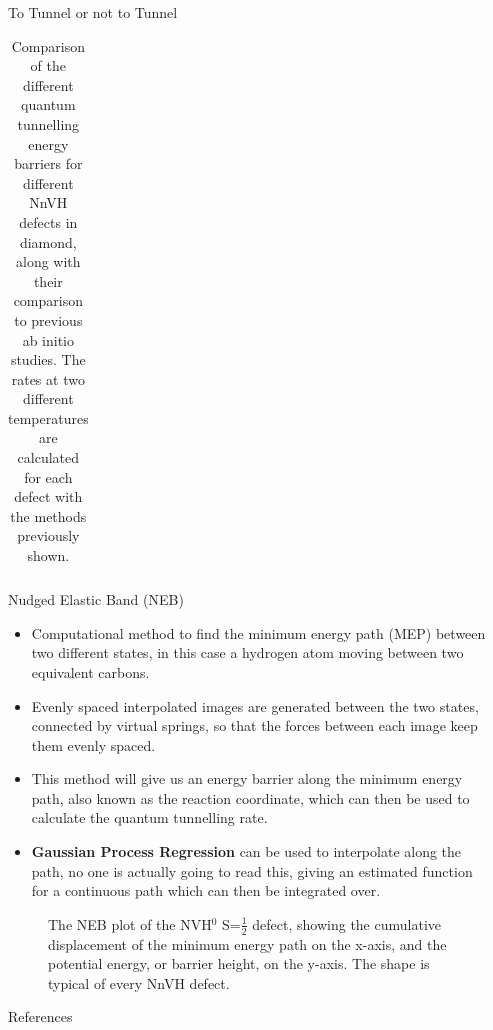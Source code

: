 \documentclass[final]{beamer}
\newlength{\sepwidth}
\newlength{\colwidth}
\newcommand{\separatorcolumn}{\begin{column}{\sepwidth}\end{column}}
\begin{document}
\begin{frame}[t]
\begin{columns}[t]
\begin{column}{\colwidth}
\begin{block}{To Tunnel or not to Tunnel}
\begin{table}[h!]
\begin{tabular}{l l c  c c c}
        \bottomrule
      \end{tabular}
      \caption{Comparison of the different quantum tunnelling energy barriers for different NnVH defects in diamond, along with their comparison to previous ab initio studies. The rates at two different temperatures are calculated for each defect with the methods previously shown.}
    \end{table}

    
  \end{block}

    \begin{block}{Nudged Elastic Band (NEB)}
    \begin{itemize}
    \item Computational method to find the minimum energy path (MEP) between two different states, in this case a hydrogen atom moving between two equivalent carbons. 
    \item Evenly spaced interpolated images are generated between the two states, connected by virtual springs, so that the forces between each image keep them evenly spaced.
    \item This method will give us an energy barrier along the minimum energy path, also known as the reaction coordinate, which can then be used to calculate the quantum tunnelling rate.
    \item \textbf{Gaussian Process Regression} can be used to interpolate along the path, no one is actually going to read this, giving an estimated function for a continuous path which can then be integrated over.
    \end{itemize}


\begin{figure}[htbp]
    \centering

    \resizebox{1\textwidth}{!}{
    
    }
    
    \caption{The NEB plot of the NVH$^0$ S=$\frac{1}{2}$ defect, showing the cumulative displacement of the minimum energy path on the x-axis, and the potential energy, or barrier height, on the y-axis. The shape is typical of every NnVH defect.}
    \label{fig:mygraph}
\end{figure}
        
    \end{block}

  \begin{block}{References}

    \nocite{*}
    \footnotesize{}

  \end{block}

\end{column}

\separatorcolumn
\end{columns}
\end{frame}
\end{document}
